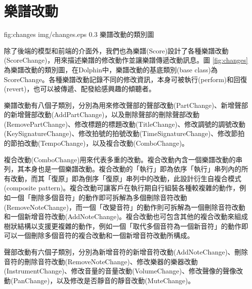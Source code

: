 \documentclass[12pt,a4paper,oneside]{report}
\begin{document}


\section{樂譜改動} %
\label{sec:changes}

\figurewithcaption
{fig:changes}
{img/changes.eps}
{0.3}
{樂譜改動的類別圖}

除了後端的模型和前端的介面外，我們也為樂譜(Score)設計了各種樂譜改動(ScoreChange)，用來描述樂譜的修改動作並讓樂譜傳遞改動訊息。圖 \ref{fig:changes}為樂譜改動的類別圖，在Dolphin中，樂譜改動的基底類別(base class)為ScoreChange。各種樂譜改動記錄不同的修改資訊，本身可被執行(perform)和回復(revert)，也可以被傳遞、配發給感興趣的傾聽者。

樂譜改動有八個子類別，分別為用來修改聲部的聲部改動(PartChange)、新增聲部的新增聲部改動(AddPartChange)，以及刪除聲部的刪除聲部改動(RemovePartChange)、修改標題的標題改動(TitleChange)、修改調號的調號改動(KeySignatureChange)、修改拍號的拍號改動(TimeSignatureChange)、修改節拍的節拍改動(TempoChange)，以及複合改動(ComboChange)。

複合改動(ComboChange)用來代表多重的改動。複合改動內含一個樂譜改動的串列，其本身也是一個樂譜改動。複合改動的「執行」即為依序「執行」串列內的所有改動，而其「復原」即為倒序「復原」串列中的改動，此設計衍生自複合模式(composite pattern)\cite{designPatterns}。複合改動可讓客戶在執行期自行組裝各種較複雜的動作，例如一個「刪除多個音符」的動作即可拆解為多個刪除音符改動(RemoveNoteChange)，而一個「改變音符」的動作則可拆解為一個刪除音符改動和一個新增音符改動(AddNoteChange)。複合改動也可包含其他的複合改動來組成樹狀結構以支援更複雜的動作，例如一個「取代多個音符為一個新音符」的動作即可以一個刪除多個音符的複合改動和一個新增音符改動所構成。

聲部改動有六個子類別，分別為新增音符的新增音符改動(AddNoteChange)、刪除音符的刪除音符改動(RemoveNoteChange)、修改樂器的樂器改動(InstrumentChange)、修改音量的音量改動(VolumeChange)、修改聲像的聲像改動(PanChange)，以及修改是否靜音的靜音改動(MuteChange)。
\end{document}

